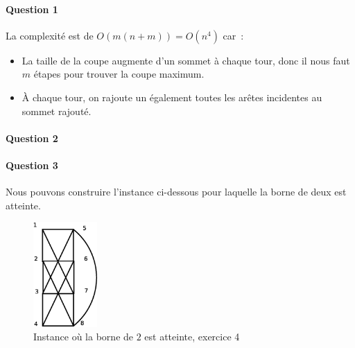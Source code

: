 \paragraph{Question 1}
La complexité est de $O(m(n+m))=O(n^4)$ car~:
\begin{itemize}
\item La taille de la coupe augmente d'un sommet à chaque tour, donc
il nous faut $m$ étapes pour trouver la coupe maximum.
\item À chaque tour, on rajoute un également toutes les arêtes
incidentes au sommet rajouté.
\end{itemize}

\paragraph{Question 2}

\paragraph{Question 3}

Nous pouvons construire l'instance ci-dessous pour laquelle la borne de
deux est atteinte. 

\begin{figure}[h!]
\centering
\includegraphics[height = 4cm]{../images/exo4.eps}
\caption{Instance où la borne de $2$ est atteinte, exercice 4}
\end{figure}
